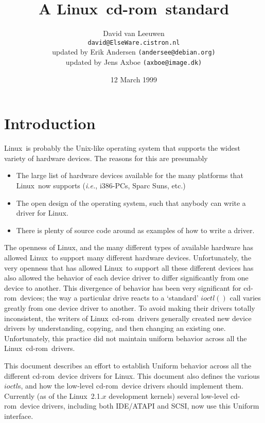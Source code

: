 \documentclass{article}
\newcommand{\newsection}[1]{\newpage\section{#1}}
\def\linux{{\sc Linux}}
\def\cdrom{{\sc cd-rom}}
\def\fo{\sl}                    %
\def\ie{{\fo i.e.}}
\begin{document}
\title{A \linux\ \cdrom\ standard}
\author{David van Leeuwen\\{\normalsize\tt david@ElseWare.cistron.nl}
\\{\footnotesize updated by Erik Andersen {\tt(andersee@debian.org)}}
\\{\footnotesize updated by Jens Axboe {\tt(axboe@image.dk)}}}
\date{12 March 1999}

\maketitle

\newsection{Introduction}

\linux\ is probably the Unix-like operating system that supports
the widest variety of hardware devices. The reasons for this are
presumably 
\begin{itemize} 
\item 
  The large list of hardware devices available for the many platforms
  that \linux\ now supports (\ie, i386-PCs, Sparc Suns, etc.)
\item 
  The open design of the operating system, such that anybody can write a
  driver for \linux.
\item 
  There is plenty of source code around as examples of how to write a driver.
\end{itemize}
The openness of \linux, and the many different types of available
hardware has allowed \linux\ to support many different hardware devices.
Unfortunately, the very openness that has allowed \linux\ to support
all these different devices has also allowed the behavior of each
device driver to differ significantly from one device to another.
This divergence of behavior has been very significant for \cdrom\
devices; the way a particular drive reacts to a `standard' $ioctl()$
call varies greatly from one device driver to another. To avoid making
their drivers totally inconsistent, the writers of \linux\ \cdrom\
drivers generally created new device drivers by understanding, copying,
and then changing an existing one. Unfortunately, this practice did not
maintain uniform behavior across all the \linux\ \cdrom\ drivers. 

This document describes an effort to establish Uniform behavior across
all the different \cdrom\ device drivers for \linux. This document also
defines the various $ioctl$s, and how the low-level \cdrom\ device
drivers should implement them. Currently (as of the \linux\ 2.1.$x$
development kernels) several low-level \cdrom\ device drivers, including
both IDE/ATAPI and SCSI, now use this Uniform interface.
\end{document}
